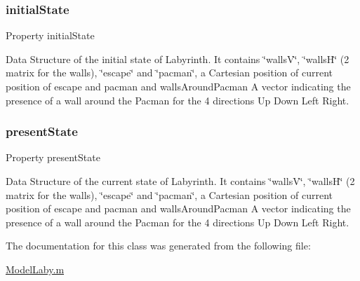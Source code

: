 \subsubsection{\texorpdfstring{initial\+State}{initialState}}
{\footnotesize\ttfamily Property initial\+State}



Data Structure of the initial state of Labyrinth. It contains \char`\"{}walls\+V\char`\"{}, \char`\"{}walls\+H\char`\"{} (2 matrix for the walls), \char`\"{}escape\char`\"{} and \char`\"{}pacman\char`\"{}, a Cartesian position of current position of escape and pacman and \textquotesingle{}walls\+Around\+Pacman\textquotesingle{} A vector indicating the presence of a wall around the Pacman for the 4 directions Up Down Left Right. 

\mbox{\label{class_model_laby_a9624cc7c421a50fa5086b0ebd0cd5fe3}} 
\subsubsection{\texorpdfstring{present\+State}{presentState}}
{\footnotesize\ttfamily Property present\+State}



Data Structure of the current state of Labyrinth. It contains \char`\"{}walls\+V\char`\"{}, \char`\"{}walls\+H\char`\"{} (2 matrix for the walls), \char`\"{}escape\char`\"{} and \char`\"{}pacman\char`\"{}, a Cartesian position of current position of escape and pacman and \textquotesingle{}walls\+Around\+Pacman\textquotesingle{} A vector indicating the presence of a wall around the Pacman for the 4 directions Up Down Left Right. 



The documentation for this class was generated from the following file\+:\begin{DoxyCompactItemize}
\item 
\hyperlink{_model_laby_8m}{Model\+Laby.\+m}\end{DoxyCompactItemize}
